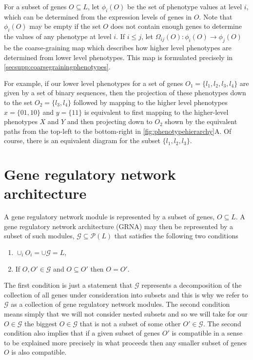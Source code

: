 For a subset of genes $O \subseteq L$, let $\phi_i (O)$ be the set of phenotype values at level $i$, which can be determined from the expression levels of genes in $O$.  Note that $\phi_i (O)$ may be empty if the set $O$ does not contain enough genes to determine the values of any phenotype at level $i$. If $i \le j$, let $\Omega_{ij}(O) : \phi_i(O) \to \phi_j(O)$ be the coarse-graining map which describes how higher level phenotypes are determined from lower level phenotypes. This map is formulated precisely in  \ref{secsupp:coarsegrainingphenotypes}.

For example, if our lower level phenotypes for a set of genes $O_1 = \{ l_1,l_2,l_3,l_4 \}$ are given by a set of binary sequences, then the projection of these phenotypes down to the set $O_2 = \{l_3,l_4\}$ followed by mapping to the higher level phenotypes $x=\{01,10\}$ and $y=\{11\}$ is equivalent to first mapping to the higher-level phenotypes $X$ and $Y$ and then projecting down to $O_2$ shown by the equivalent paths from the top-left to the bottom-right in \ref{fig:phenotypehierarchy}A.
Of course, there is an equivalent diagram for the subset $\{ l_1,l_2,l_3 \}$.

\section{Gene regulatory network architecture}\label{sec:covergenotypespace}
A gene regulatory network module is represented by a subset of genes, $O \subseteq L$. A gene regulatory network architecture (GRNA) may then be represented by a subset of such modules, $\mathcal{G} \subseteq \mathcal{P}(L)$ that satisfies the following two conditions
\begin{enumerate}
\item $\cup_i O_i = \cup \mathcal{G} = L$,
\item If $O,O' \in \mathcal{G}$ and $O \subseteq O'$ then $O = O'$.
\end{enumerate}
The first condition is just a statement that $\mathcal{G}$ represents a decomposition of the collection of all genes under consideration into subsets and this is why we refer to $\mathcal{G}$ as a collection of gene regulatory network modules. The second condition means simply that we will not consider nested subsets and so we will take for our $O \in \mathcal{G}$ the biggest $O \in \mathcal{G}$ that is not a subset of some other $O' \in \mathcal{G}$. The second condition also implies that if a given subset of genes $O'$ is compatible in a sense to be explained more precisely in what proceeds then any smaller subset of genes $O$ is also compatible.

